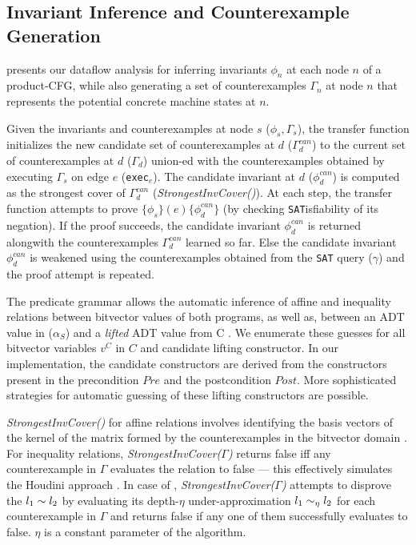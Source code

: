 


\subsection{Invariant Inference and Counterexample Generation}
\label{sec:invinference}

 presents our dataflow analysis for inferring invariants $\phi_n$
at each node $n$ of a product-CFG, while also generating a set of counterexamples $\Gamma_n$ at node $n$
that represents the potential concrete machine states at $n$.

Given the invariants and counterexamples at node $s$
($\phi_s,\Gamma_s$),
the transfer function initializes the new candidate set
of counterexamples at $d$ ($\Gamma^{can}_{d}$)
to the current set of counterexamples at $d$ ($\Gamma_{d}$) union-ed with
the counterexamples obtained by executing $\Gamma_s$ on edge $e$ ({\tt exec$_e$}).
The candidate invariant at $d$ ($\phi^{can}_d$) is computed
as the strongest cover of $\Gamma^{can}_{d}$ ({\em StrongestInvCover()}).
At each step, the transfer function attempts to prove
$\{\phi_s\} (e) \{\phi^{can}_d\}$ (by checking {\tt SAT}isfiability of its
negation). If the proof succeeds, the candidate invariant $\phi^{can}_d$ is
returned alongwith the counterexamples $\Gamma^{can}_d$ learned so far.
Else the candidate invariant $\phi^{can}_d$ is weakened using
the counterexamples obtained from the {\tt SAT} query ($\gamma$) and the proof attempt is
repeated.

The predicate grammar allows the automatic inference of
affine and inequality relations between bitvector values of both
programs, as well as, \recursiveRelations{} between an ADT value in \SpecL{} ($\alpha_S$)
and a {\em lifted} ADT value from C .
We enumerate these \recursiveRelation{}
guesses for all bitvector variables $v^{C}$ in $C$ and candidate  lifting constructor.
In our implementation, the candidate 
constructors are derived from the constructors
present in the precondition $Pre$
and the postcondition $Post$.  More
sophisticated strategies for automatic guessing of
these lifting constructors
are possible.

{\em StrongestInvCover()} for affine relations involves
identifying the basis vectors of the kernel of the
matrix formed by the counterexamples in the bitvector
domain \cite{esop05,semalign}.
For inequality relations, {\em StrongestInvCover($\Gamma$)}
returns false iff any counterexample in $\Gamma$ evaluates the
relation to false --- this effectively simulates the Houdini approach \cite{houdini}.
In case of \recursiveRelations{}, {\em StrongestInvCover($\Gamma$)}
attempts to disprove the \recursiveRelation{} $l_1 \sim{} l_2$ by evaluating
its depth-$\eta$ under-approximation $l_1 \sim_\eta l_2$ for each counterexample
in $\Gamma$ and returns false if any one of them successfully evaluates to false.
$\eta$ is a constant parameter of the algorithm.

